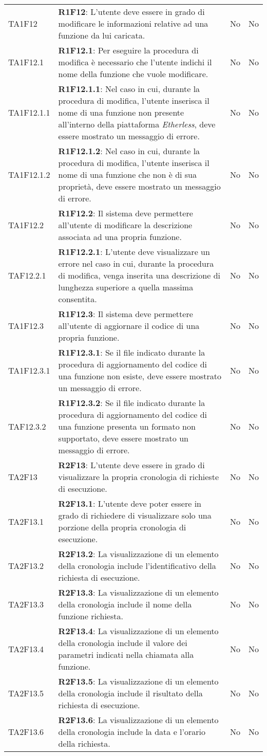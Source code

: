 \begin{longtable}{
		>{\centering}p{} 
		>{}p{}
		>{\centering}p{}
		>{\centering}p{} }
	TA1F12 		& \textbf{R1F12}: L'utente deve essere in grado di modificare le informazioni relative ad una funzione da lui caricata. 																	& No & No \tabularnewline
	TA1F12.1 	& \textbf{R1F12.1}: Per eseguire la procedura di modifica è necessario che l'utente indichi il nome della funzione che vuole modificare. 													& No & No \tabularnewline
	TA1F12.1.1 	& \textbf{R1F12.1.1}: Nel caso in cui, durante la procedura di modifica, l'utente inserisca il nome di una funzione non presente all'interno della piattaforma \textit{Etherless}, deve essere mostrato un messaggio di errore.	& No & No \tabularnewline
	TA1F12.1.2 	& \textbf{R1F12.1.2}: Nel caso in cui, durante la procedura di modifica, l'utente inserisca il nome di una funzione che non è di sua proprietà, deve essere 	mostrato un messaggio di errore. & No & No \tabularnewline
	TA1F12.2 	& \textbf{R1F12.2}: Il sistema deve permettere all'utente di modificare la descrizione associata ad una propria funzione. 																	& No & No \tabularnewline
	TAF12.2.1 	& \textbf{R1F12.2.1}: L'utente deve visualizzare un errore nel caso in cui, durante la procedura di modifica, venga inserita una descrizione di lunghezza superiore a quella massima consentita. 	& No & No \tabularnewline
	TA1F12.3 	& \textbf{R1F12.3}: Il sistema deve permettere all'utente di aggiornare il codice di una propria funzione. 																				& No & No \tabularnewline
	TA1F12.3.1 	& \textbf{R1F12.3.1}: Se il file indicato durante la procedura di aggiornamento del codice di una funzione non esiste, deve essere mostrato un messaggio di errore.							& No & No \tabularnewline
	TAF12.3.2 	& \textbf{R1F12.3.2}: Se il file indicato durante la procedura di aggiornamento del codice di una funzione presenta un formato non supportato, deve essere mostrato un messaggio di errore.	& No & No \tabularnewline

	TA2F13 		& \textbf{R2F13}: L'utente deve essere in grado di visualizzare la propria cronologia di richieste di esecuzione. 																		& No & No \tabularnewline
	TA2F13.1 	& \textbf{R2F13.1}: L'utente deve poter essere in grado di richiedere di visualizzare solo una porzione della propria cronologia di esecuzione. 											& No & No \tabularnewline
	TA2F13.2 	& \textbf{R2F13.2}: La visualizzazione di un elemento della cronologia include l'identificativo della richiesta di esecuzione. 															& No & No \tabularnewline
	TA2F13.3 	& \textbf{R2F13.3}: La visualizzazione di un elemento della cronologia include il nome della funzione richiesta. 																			& No & No \tabularnewline
	TA2F13.4 	& \textbf{R2F13.4}: La visualizzazione di un elemento della cronologia include il valore dei parametri indicati nella chiamata alla funzione.												& No & No \tabularnewline
	TA2F13.5 	& \textbf{R2F13.5}: La visualizzazione di un elemento della cronologia include il risultato della richiesta di esecuzione.																	& No & No \tabularnewline
	TA2F13.6 	& \textbf{R2F13.6}: La visualizzazione di un elemento della cronologia include la data e l'orario della richiesta. 																		& No & No \tabularnewline


\end{longtable}
